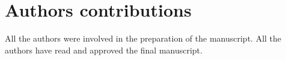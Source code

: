 \section{Authors contributions}
All the authors were involved in the preparation of the manuscript.
All the authors have read and approved the final manuscript.










